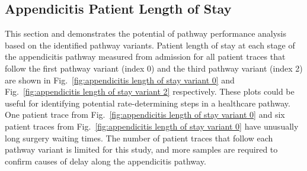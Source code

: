 \subsection{Appendicitis Patient Length of Stay}
This section and demonstrates the potential of pathway performance analysis based on the identified pathway variants. Patient length of stay at each stage of the appendicitis pathway measured from admission for all patient traces that follow the first pathway variant (index 0) and the third pathway variant (index 2) are shown in Fig.~\ref{fig:appendicitis length of stay variant 0} and Fig.~\ref{fig:appendicitis length of stay variant 2} respectively. These plots could be useful for identifying potential rate-determining steps in a healthcare pathway. One patient trace from Fig.~\ref{fig:appendicitis length of stay variant 0} and six patient traces from Fig.~\ref{fig:appendicitis length of stay variant 0} have unusually long surgery waiting times. The number of patient traces that follow each pathway variant is limited for this study, and more samples are required to confirm causes of delay along the appendicitis pathway. 

